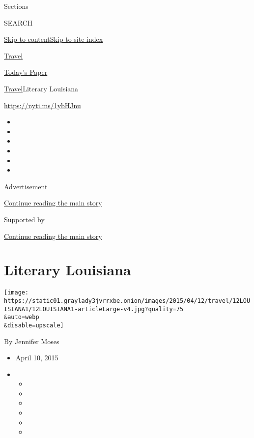 Sections

SEARCH

\protect\hyperlink{site-content}{Skip to
content}\protect\hyperlink{site-index}{Skip to site index}

\href{https://www.nytimes3xbfgragh.onion/section/travel}{Travel}

\href{https://myaccount.nytimes3xbfgragh.onion/auth/login?response_type=cookie\&client_id=vi}{}

\href{https://www.nytimes3xbfgragh.onion/section/todayspaper}{Today's
Paper}

\href{/section/travel}{Travel}\textbar{}Literary Louisiana

\url{https://nyti.ms/1ybHJnu}

\begin{itemize}
\item
\item
\item
\item
\item
\item
\end{itemize}

Advertisement

\protect\hyperlink{after-top}{Continue reading the main story}

Supported by

\protect\hyperlink{after-sponsor}{Continue reading the main story}

\hypertarget{literary-louisiana}{%
\section{Literary Louisiana}\label{literary-louisiana}}

\texttt{[image: https://static01.graylady3jvrrxbe.onion/images/2015/04/12/travel/12LOUISIANA1/12LOUISIANA1-articleLarge-v4.jpg?quality=75\\\&auto=webp\\\&disable=upscale]}

By Jennifer Moses

\begin{itemize}
\item
  April 10, 2015
\item
  \begin{itemize}
  \item
  \item
  \item
  \item
  \item
  \item
  \end{itemize}
\end{itemize}

